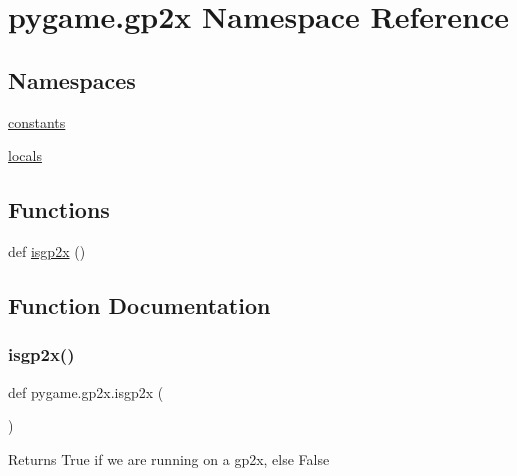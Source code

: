 \hypertarget{namespacepygame_1_1gp2x}{}\section{pygame.\+gp2x Namespace Reference}
\label{namespacepygame_1_1gp2x}
\subsection*{Namespaces}
\begin{DoxyCompactItemize}
\item 
 \hyperlink{namespacepygame_1_1gp2x_1_1constants}{constants}
\item 
 \hyperlink{namespacepygame_1_1gp2x_1_1locals}{locals}
\end{DoxyCompactItemize}
\subsection*{Functions}
\begin{DoxyCompactItemize}
\item 
def \hyperlink{namespacepygame_1_1gp2x_a2b2d425151d856d3f1df7faba4e971ca}{isgp2x} ()
\end{DoxyCompactItemize}


\subsection{Function Documentation}
\mbox{\label{namespacepygame_1_1gp2x_a2b2d425151d856d3f1df7faba4e971ca}} 
\subsubsection{\texorpdfstring{isgp2x()}{isgp2x()}}
{\footnotesize\ttfamily def pygame.\+gp2x.\+isgp2x (\begin{DoxyParamCaption}{ }\end{DoxyParamCaption})}

\begin{DoxyVerb}Returns True if we are running on a gp2x, else False
\end{DoxyVerb}
 